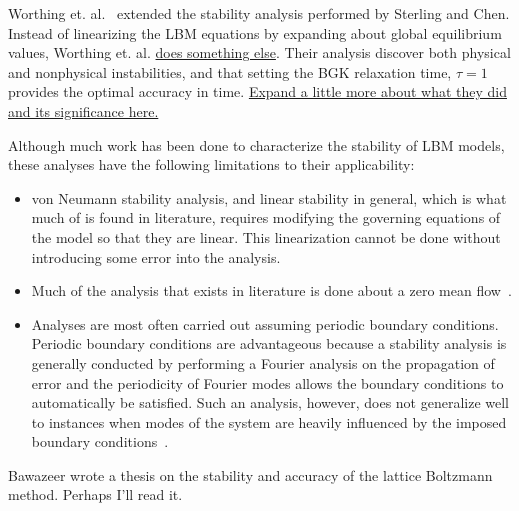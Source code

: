 \documentclass{article}
\begin{document}
Worthing et. al.~\cite{worthing1997stability} extended the stability analysis performed by Sterling and Chen.
Instead of linearizing the LBM equations by expanding about global equilibrium values, Worthing et. al. \ul{does something else}.
Their analysis discover both physical and nonphysical instabilities, and that setting the BGK relaxation time, $\tau = 1$ provides the optimal accuracy in time. %
\ul{Expand a little more about what they did and its significance here.}

Although much work has been done to characterize the stability of LBM models, these analyses have the following limitations to their applicability:

\begin{itemize}
	\item von Neumann stability analysis, and linear stability in general, which is what much of is found in literature, requires modifying the governing equations of the model so that they are linear.
	This linearization cannot be done without introducing some error into the analysis. %
	\item Much of the analysis that exists in literature is done about a zero mean flow~\cite{worthing1997stability}. %
	\item Analyses are most often carried out assuming periodic boundary conditions.
	Periodic boundary conditions are advantageous because a stability analysis is generally conducted by performing a Fourier analysis on the propagation of error and the periodicity of Fourier modes allows the boundary conditions to automatically be satisfied.
	Such an analysis, however, does not generalize well to instances when modes of the system are heavily influenced by the imposed boundary conditions~\cite{worthing1997stability}. %
\end{itemize}

{\color{red} Bawazeer wrote a thesis on the stability and accuracy of the lattice Boltzmann method. Perhaps I'll read it.}
\end{document}
